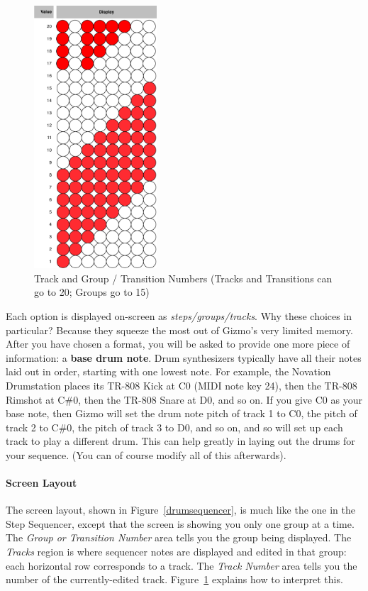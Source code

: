 \documentclass{article}
\begin{document}
\begin{figure}
\vspace{-1em}
\includegraphics[width=1.8in]{20val.pdf}
\vspace{-1em}\caption{\small Track and Group / Transition Numbers (Tracks and Transitions can go to 20; Groups go to 15)}
\vspace{-2em}
\label{trackgrouptransitionnumber}
\end{figure}

\vspace{1em}Each option is displayed on-screen as {\it steps/groups/tracks}.  Why these choices in particular? Because they squeeze the most out of Gizmo's very limited memory.   After you have chosen a format, you will be asked to provide one more piece of information: a {\bf base drum note}.  Drum synthesizers typically have all their notes laid out in order, starting with one lowest note.  For example, the Novation Drumstation places its TR-808 Kick at C0 (MIDI note key 24), then the TR-808 Rimshot at C\#0, then the TR-808 Snare at D0, and so on.  If you give C0 as your base note, then Gizmo will set the drum note pitch of track 1 to C0, the pitch of track 2 to C\#0, the pitch of track 3 to D0, and so on, and so will set up each track to play a different drum. This can help greatly in laying out the drums for your sequence.  (You can of course modify all of this afterwards).

\paragraph{Screen Layout} The screen layout, shown in Figure~\ref{drumsequencer}, is much like the one in the Step Sequencer, except that the screen is showing you only one group at a time.  The {\it Group or Transition Number} area tells you the group being displayed.  The {\it Tracks} region is where sequencer notes are displayed and edited in that group: each horizontal row corresponds to a track.  The {\it Track Number} area tells you the number of the currently-edited track.  Figure~\ref{trackgrouptransitionnumber} explains how to interpret this.
\end{document}
